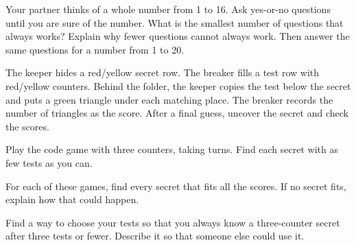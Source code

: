 


\fontsize{12.5}{16.5}\selectfont

\problem Your partner thinks of a whole number from 1 to 16.
Ask yes-or-no questions until you are sure of the number.
What is the smallest number of questions that always works?
Explain why fewer questions cannot always work.
Then answer the same questions for a number from 1 to 20.


\newpage

The keeper hides a red/yellow secret row. The breaker fills a test row with red/yellow counters.
Behind the folder, the keeper copies the test below the secret and puts a green triangle under each matching place.
The breaker records the number of triangles as the score. After a final guess, uncover the secret and check the scores.

\problem Play the code game with three counters, taking turns.
Find each secret with as few tests as you can.

\vspace{0.1in}
{\renewcommand{\codepitch}{1.08}\renewcommand{\codecopy}{-1.08}
\renewcommand{\codetriangle}{-2.52}\renewcommand{\codefold}{-2.64}
\renewcommand{\codetest}{-3.25}\renewcommand{\codescorelabel}{\node[anchor=west,font=\small] at ({\bw+1.4},\codetest) {score};}}

\newpage

\problem For each of these games, find every secret that fits all the scores.
If no secret fits, explain how that could happen.

\vspace{0.15in}
\pzsep
{}
\pzsep
{}
\pzsep
{}
\pzsep
{}

\newpage

\problem Find a way to choose your tests so that you always know a three-counter secret after three tests or fewer.
Describe it so that someone else could use it.

\vspace{0.1in}
\noindent{}\hfill{}\hfill{}\hfill{}


\newpage

